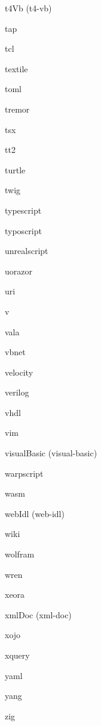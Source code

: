 \begin{DoxyItemize}
\item t4\+Vb (t4-\/vb)
\item tap
\item tcl
\item textile
\item toml
\item tremor
\item tsx
\item tt2
\item turtle
\item twig
\item typescript
\item typoscript
\item unrealscript
\item uorazor
\item uri
\item v
\item vala
\item vbnet
\item velocity
\item verilog
\item vhdl
\item vim
\item visual\+Basic (visual-\/basic)
\item warpscript
\item wasm
\item web\+Idl (web-\/idl)
\item wiki
\item wolfram
\item wren
\item xeora
\item xml\+Doc (xml-\/doc)
\item xojo
\item xquery
\item yaml
\item yang
\item zig 
\end{DoxyItemize}